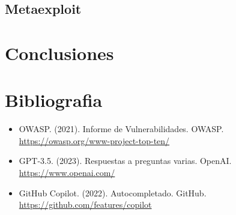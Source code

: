 \documentclass{report}
\begin{document}
        \section{Metaexploit}
    \chapter{Conclusiones}
    \chapter{Bibliografia}
        \begin{itemize}
            \item OWASP. (2021). Informe de Vulnerabilidades. OWASP. \url{https://owasp.org/www-project-top-ten/}
            \item GPT-3.5. (2023). Respuestas a preguntas varias. OpenAI. \url{https://www.openai.com/}
            \item GitHub Copilot. (2022). Autocompletado. GitHub. \url{https://github.com/features/copilot}
        \end{itemize}
\end{document}
